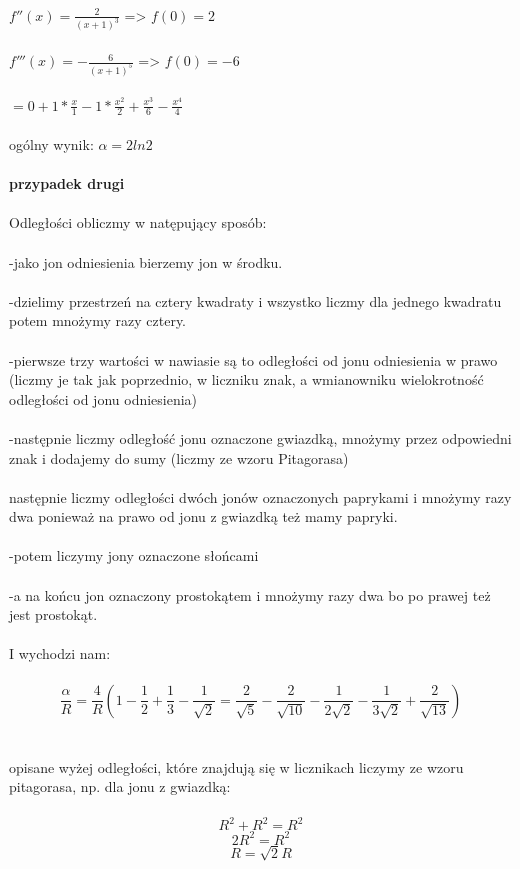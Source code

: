 \\
$f''(x)=\frac{2}{(x+1)^3}$   =>   $f(0)=2$
\\
\\
$f'''(x)=-\frac{6}{(x+1)^5}$   =>   $f(0)=-6$
\\
\\
$=0+1*\frac{x}{1}-1*\frac{x^2}{2}+\frac{x^3}{6}-\frac{x^4}{4}$
\\
\\
ogólny wynik:
$\alpha=2ln2$
\\
\\
\textbf{przypadek drugi}
\\
\\
Odległości obliczmy w natępujący sposób:
\\
\\
-jako jon odniesienia bierzemy jon w środku.
\\
\\
-dzielimy przestrzeń na cztery kwadraty i wszystko liczmy dla jednego kwadratu potem mnożymy razy cztery.
\\
\\
-pierwsze trzy wartości w nawiasie są to odległości od jonu odniesienia w prawo (liczmy je tak jak poprzednio, w liczniku znak, a wmianowniku wielokrotność odległości od jonu odniesienia)
\\
\\
-następnie liczmy odległość jonu oznaczone gwiazdką, mnożymy przez odpowiedni znak i dodajemy do sumy (liczmy ze wzoru Pitagorasa)
\\
\\
następnie liczmy odległości dwóch jonów oznaczonych paprykami i mnożymy razy dwa ponieważ na prawo od jonu z gwiazdką też mamy papryki.
\\
\\
-potem liczymy jony oznaczone słońcami 
\\
\\
-a na końcu jon oznaczony prostokątem i mnożymy razy dwa bo po prawej też jest prostokąt.
\\
\\
I wychodzi nam:
\\
\\
\begin{equation}
\frac{\alpha}{R} =\frac{4}{R}(1-\frac{1}{2}+\frac{1}{3}-\frac{1}{\sqrt{2}}=\frac{2}{\sqrt{5}}-\frac{2}{\sqrt{10}}-\frac{1}{2\sqrt{2}}-\frac{1}{3\sqrt{2}}+\frac{2}{\sqrt{13}})
\end{equation}
\\
\\
opisane wyżej odległości, które znajdują się w licznikach liczymy ze wzoru pitagorasa, np. dla jonu z gwiazdką:
\\
\\
\begin{equation}
R^2+R^2=R^2
\end{equation}
\begin{equation}
2R^2=R^2
\end{equation}
\begin{equation}
R=\sqrt{2}R
\end{equation}
